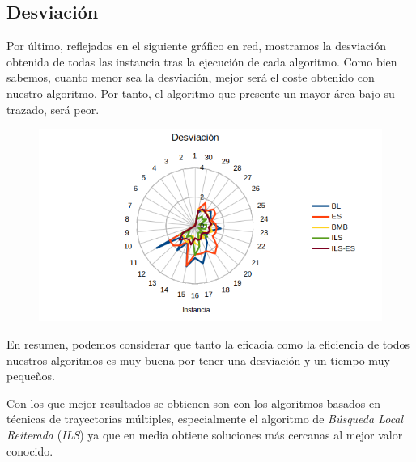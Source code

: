 \subsection{Desviación}
Por último, reflejados en el siguiente gráfico en red, mostramos la desviación obtenida de todas las instancia tras la ejecución de cada algoritmo. Como bien sabemos, cuanto menor sea la desviación, mejor será el coste obtenido con nuestro algoritmo. Por tanto, el algoritmo que presente un mayor área bajo su trazado, será peor.




\begin{figure}[H]
	\centering
	\includegraphics[scale=0.6]{img/desv.png}
	
\end{figure}



En resumen, podemos considerar que tanto la eficacia como la eficiencia de todos nuestros algoritmos es muy buena por tener una desviación y un tiempo muy pequeños.

Con los que mejor resultados se obtienen son con los algoritmos basados en técnicas de trayectorias múltiples, especialmente el algoritmo de \textit{Búsqueda Local Reiterada} (\textit{ILS}) ya que en media obtiene soluciones más cercanas al mejor valor conocido.









